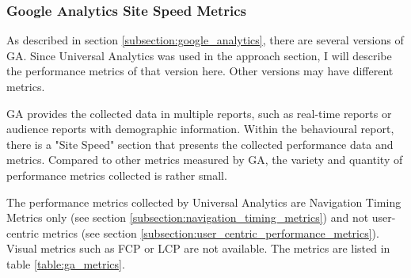 




\subsubsection{Google Analytics Site Speed Metrics} %
\label{subsubsection:ga_metrics}

As described in section \ref{subsection:google_analytics}, there are several versions of GA.
Since Universal Analytics was used in the approach section, I will describe the performance metrics of that version here.
Other versions may have different metrics.


GA provides the collected data in multiple reports, such as real-time reports or audience reports with demographic information.
Within the behavioural report, there is a "Site Speed" section that presents the collected performance data and metrics.
Compared to other metrics measured by GA, the variety and quantity of performance metrics collected is rather small.


The performance metrics collected by Universal Analytics are Navigation Timing Metrics only (see section \ref{subsection:navigation_timing_metrics}) and not user-centric metrics (see section \ref{subsection:user_centric_performance_metrics}).
Visual metrics such as FCP or LCP are not available.
The metrics are listed in table \ref{table:ga_metrics}.

